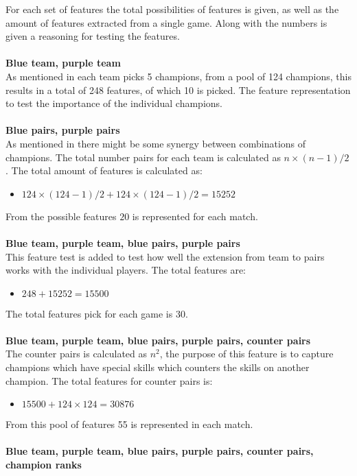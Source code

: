 For each set of features the total possibilities of features is given, as well as the amount of features extracted from a single game. Along with the numbers is given a reasoning for testing the features.  
\\\\
\textbf{Blue team, purple team} \\
As mentioned in  each team picks 5 champions, from a pool of 124 champions, this results in a total of 248 features, of which 10 is picked. The feature representation to test the importance of the individual champions. \\\\
\textbf{Blue pairs, purple pairs} \\
As mentioned in   there might be some synergy between combinations of champions. The total number pairs for each team is calculated as $n \times (n-1)/2$. The total amount of features is calculated as:  
\begin{itemize}
\item $124 \times (124-1)/2 + 124 \times (124-1)/2 = 15252$
\end{itemize}
From the possible features $20$ is represented for each match. \\\\
\textbf{Blue team, purple team, blue pairs, purple pairs} \\
This feature test is added to test how well the extension from team to pairs works with the individual players. The total features are: 
\begin{itemize}
\item $248 + 15252 = 15500$
\end{itemize}
The total features pick for each game is 30.\\\\
\textbf{Blue team, purple team, blue pairs, purple pairs, counter pairs}\\
The counter pairs is calculated as $n^2$, the purpose of this feature is to capture champions which have special skills which counters the skills on another champion. The total features for counter pairs is: 
\begin{itemize}
\item $15500+124\times124 = 30876$
\end{itemize}
From this pool of features 55 is represented in each match.\\\\
\textbf{Blue team, purple team, blue pairs, purple pairs, counter pairs, champion ranks}\\
